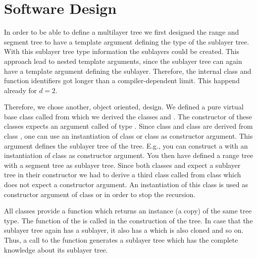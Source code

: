 
\section{Software Design}

In order to be able to define a multilayer tree we first
designed the range and segment tree to have a template argument
defining the type of the sublayer tree. With this sublayer tree
type information the sublayers could be created. This approach lead to nested
template arguments, since the sublayer tree can again have a template
argument defining the sublayer. Therefore, the internal class and function
identifiers got longer than a compiler-dependent limit.
This happend already for $d=2$.

Therefore, we chose another, object oriented,
design. We defined  a pure
virtual base class called  from which we derived
the classes  and  .
The constructor of these classes expects an argument called
 of type
. 
Since class  and class
 are derived from class , one can
use an instantiation of class  or class
 as constructor argument.
This argument defines the sublayer tree of the tree. E.g., you
can construct a  with an
instantiation of class  as constructor
argument. You then have defined a range tree with a segment tree
as sublayer tree. Since both classes  and 
 expect a sublayer tree in their constructor
we had to derive a third class called  from
class   which
does not expect a constructor argument. An instantiation of this
class is used as constructor argument of class  or
 in order to stop the recursion.

All classes provide a  function which returns an
instance (a copy) of the same tree type. The  
function of the  is called  in the
construction of the tree. In case that the sublayer tree again
has a sublayer, it also has a   which is
also cloned and so on. Thus, a call to the  function
generates a sublayer tree which has the complete knowledge about
its sublayer tree.

